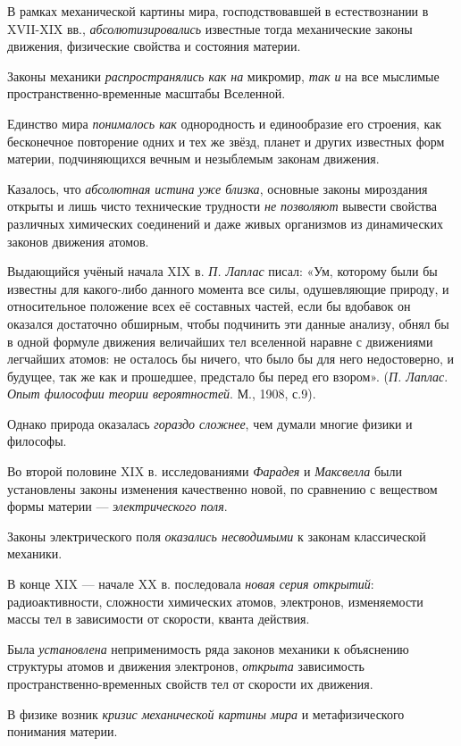 \documentclass[a4paper,14pt,russian]{extreport}
\begin{document}
В рамках механической картины мира, господствовавшей в естествознании в XVII-XIX вв., \emph{абсолютизировались} известные тогда механические законы движения, физические свойства и состояния материи.

Законы механики \emph{распространялись как на} микромир, \emph{так и} на все мыслимые пространственно-временные масштабы Вселенной.

Единство мира \emph{понималось как} однородность и единообразие его строения, как бесконечное повторение одних и тех же звёзд, планет и других известных форм материи, подчиняющихся вечным и незыблемым законам движения.

Казалось, что \emph{абсолютная истина} \emph{уже близка}, основные законы мироздания открыты и лишь чисто технические трудности \emph{не позволяют} вывести свойства различных химических соединений и даже живых организмов из динамических законов движения атомов.

Выдающийся учёный начала XIX в. \emph{П. Лаплас} писал: «Ум, которому были бы известны для какого-либо данного момента все силы, одушевляющие природу, и относительное положение всех её составных частей, если бы вдобавок он оказался достаточно обширным, чтобы подчинить эти данные анализу, обнял бы в одной формуле движения величайших тел вселенной наравне с движениями легчайших атомов: не осталось бы ничего, что было бы для него недостоверно, и будущее, так же как и прошедшее, предстало бы перед его взором». (\emph{П. Лаплас}. \emph{Опыт философии теории вероятностей}. М., 1908, с.9).

Однако природа оказалась \emph{гораздо сложнее}, чем думали многие физики и философы.

Во второй половине XIX в. исследованиями \emph{Фарадея} и \emph{Максвелла} были установлены законы изменения качественно новой, по сравнению с веществом формы материи --- \emph{электрического поля}.

Законы электрического поля \emph{оказались несводимыми} к законам классической механики.

В конце XIX --- начале XX в. последовала \emph{новая серия открытий}: радиоактивности, сложности химических атомов, электронов, изменяемости массы тел в зависимости от скорости, кванта действия.

Была \emph{установлена} неприменимость ряда законов механики к объяснению структуры атомов и движения электронов, \emph{открыта} зависимость пространственно-временных свойств тел от скорости их движения.

В физике возник \emph{кризис механической картины мира} и метафизического понимания материи.
\end{document}
